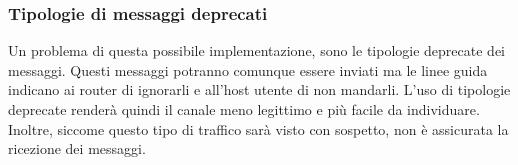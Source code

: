\subsubsection{Tipologie di messaggi deprecati} 
Un problema di questa possibile implementazione, sono le tipologie deprecate 
dei messaggi. Questi messaggi potranno comunque essere inviati ma le linee 
guida \cite{icmp_deprecated}\cite{rfc6918_deprecated_types}\cite{rfc6633_sourcequench} 
indicano ai router di ignorarli e all'host utente di non mandarli.  
\vspace{1ex} \newline 
L'uso di tipologie deprecate renderà quindi il canale meno legittimo e più 
facile da individuare. Inoltre, siccome questo tipo di traffico sarà visto 
con sospetto, non è assicurata la ricezione dei messaggi. 



